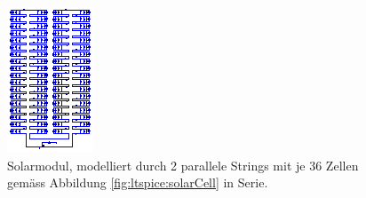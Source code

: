 \begin{figure}[h!tb]
    \centering
    \includegraphics[width=\textwidth]{images/ltspice/module-72cells-series.eps}
    \caption{%
        Solarmodul,  modelliert durch  2 parallele  Strings mit  je 36  Zellen
        gem\"ass Abbildung \ref{fig:ltspice:solarCell} in Serie.
    }
    \label{fig:ltspice:solarmodul:cellBased}
\end{figure}
